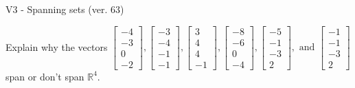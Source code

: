 \begin{exercise}
  \begin{exerciseTitle}V3 - Spanning sets (ver. 63)\end{exerciseTitle}
  \begin{exerciseStatement}
    Explain why the vectors \(\left[\begin{array}{r}
-4 \\
-3 \\
0 \\
-2
\end{array}\right] , \left[\begin{array}{r}
-3 \\
-4 \\
-1 \\
-1
\end{array}\right] , \left[\begin{array}{r}
3 \\
4 \\
4 \\
-1
\end{array}\right] , \left[\begin{array}{r}
-8 \\
-6 \\
0 \\
-4
\end{array}\right] , \left[\begin{array}{r}
-5 \\
-1 \\
-3 \\
2
\end{array}\right] , \text{ and } \left[\begin{array}{r}
-1 \\
-1 \\
-3 \\
2
\end{array}\right]\) span or don't span \(\mathbb{R}^4\). 
	



\end{exerciseStatement}
\end{exercise}
